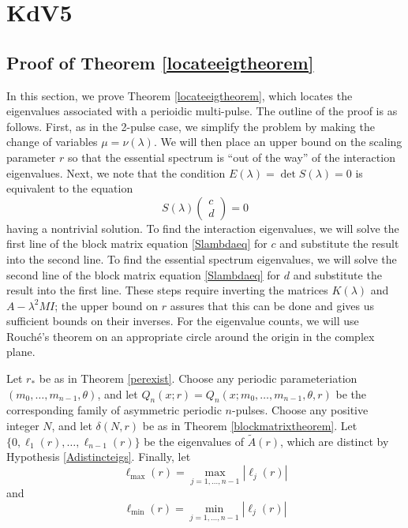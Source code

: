 \documentclass[thesis.tex]{subfiles}
\begin{document}
\iffulldocument\else
	\chapter{KdV5}
\fi

\section{Proof of Theorem \ref{locateeigtheorem}}

In this section, we prove Theorem \ref{locateeigtheorem}, which locates the eigenvalues associated with a perioidic multi-pulse. The outline of the proof is as follows. First, as in the 2-pulse case, we simplify the problem by making the change of variables $\mu = \nu(\lambda)$. We will then place an upper bound on the scaling parameter $r$ so that the essential spectrum is ``out of the way'' of the interaction eigenvalues. Next, we note that the condition $E(\lambda) = \det S(\lambda) = 0$ is equivalent to the equation
\begin{equation}\label{Slambdaeq}
S(\lambda)\begin{pmatrix}c\\d\end{pmatrix} = 0
\end{equation}
having a nontrivial solution. To find the interaction eigenvalues, we will solve the first line of the block matrix equation \cref{Slambdaeq} for $c$ and substitute the result into the second line. To find the essential spectrum eigenvalues, we will solve the second line of the block matrix equation \cref{Slambdaeq} for $d$ and substitute the result into the first line. These steps require inverting the matrices $K(\lambda)$ and $A - \lambda^2 M I$; the upper bound on $r$ assures that this can be done and gives us sufficient bounds on their inverses. For the eigenvalue counts, we will use Rouch\'e's theorem on an appropriate circle around the origin in the complex plane.

Let $r_*$ be as in Theorem \ref{perexist}. Choose any periodic parameteriation $(m_0, \dots, m_{n-1}, \theta)$, and let $Q_n(x; r) = Q_n(x; m_0, \dots, m_{n-1}, \theta, r)$ be the corresponding family of asymmetric periodic $n$-pulses. Choose any positive integer $N$, and let $\delta(N,r)$ be as in Theorem \ref{blockmatrixtheorem}. Let $\{ 0, \ell_1(r), \dots, \ell_{n-1}(r) \}$ be the eigenvalues of $\tilde{A}(r)$, which are distinct by Hypothesis \ref{Adistincteigs}. Finally, let
\[
\ell_{\max}(r) = \max_{j = 1, \dots, n-1}|\ell_j(r)|
\]
and
\[
\ell_{\min}(r) = \min_{j = 1, \dots, n-1}|\ell_j(r)|
\]
\end{document}
